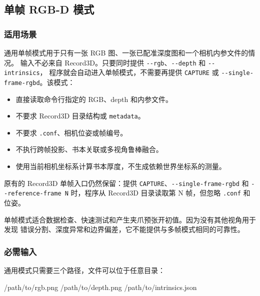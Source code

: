 \documentclass[
  chinese,
  11pt,
  a4paper,
]{article}
\newenvironment{Shaded}{\begin{snugshade}}{\end{snugshade}}
\newcommand{\NormalTok}[1]{#1}
\providecommand{\tightlist}{%
  \setlength{\itemsep}{0pt}\setlength{\parskip}{0pt}}
\begin{document}
\subsection{单帧 RGB-D 模式}\label{ux5355ux5e27-rgb-d-ux6a21ux5f0f}

\subsubsection{适用场景}\label{ux9002ux7528ux573aux666f}

通用单帧模式用于只有一张 RGB
图、一张已配准深度图和一个相机内参文件的情况。 输入不必来自
Record3D。只要同时提供 \texttt{-\/-rgb}、\texttt{-\/-depth} 和
\texttt{-\/-intrinsics}， 程序就会自动进入单帧模式，不需要再提供
\texttt{CAPTURE} 或 \texttt{-\/-single-frame-rgbd}。该模式：

\begin{itemize}
\tightlist
\item
  直接读取命令行指定的 RGB、depth 和内参文件。
\item
  不要求 Record3D 目录结构或 \texttt{metadata}。
\item
  不要求 \texttt{.conf}、相机位姿或帧编号。
\item
  不执行跨帧投影、书本关联或多视角鲁棒融合。
\item
  使用当前相机坐标系计算书本厚度，不生成依赖世界坐标系的测量。
\end{itemize}

原有的 Record3D 单帧入口仍然保留：提供
\texttt{CAPTURE}、\texttt{-\/-single-frame-rgbd} 和
\texttt{-\/-reference-frame\ N} 时，程序从 Record3D 目录读取第 N
帧，但忽略 \texttt{.conf} 和位姿。

单帧模式适合数据检查、快速测试和产生夹爪预张开初值。因为没有其他视角用于发现
错误分割、深度异常和边界偏差，它不能提供与多帧模式相同的可靠性。

\subsubsection{必需输入}\label{ux5fc5ux9700ux8f93ux5165}

通用模式只需要三个路径，文件可以位于任意目录：

\begin{Shaded}
\begin{Highlighting}[]
\NormalTok{/path/to/rgb.png}
\NormalTok{/path/to/depth.png}
\NormalTok{/path/to/intrinsics.json}
\end{Highlighting}
\end{Shaded}
\end{document}

